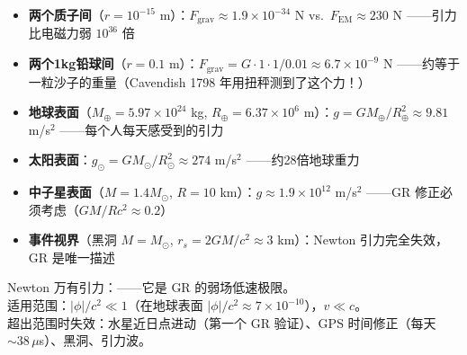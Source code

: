 

\begin{oombox}
  \begin{itemize}
    \item \textbf{两个质子间}（$r=10^{-15}$ m）：$F_{\text{grav}} \approx 1.9 \times 10^{-34}$ N vs.\ $F_{\text{EM}} \approx 230$ N ——引力比电磁力弱 $10^{36}$ 倍
    \item \textbf{两个1kg铅球间}（$r=0.1$ m）：$F_{\text{grav}} = G\cdot 1\cdot 1 / 0.01 \approx 6.7 \times 10^{-9}$ N ——约等于一粒沙子的重量（Cavendish 1798 年用扭秤测到了这个力！）
    \item \textbf{地球表面}（$M_\oplus=5.97\times10^{24}$ kg, $R_\oplus=6.37\times10^6$ m）：$g = GM_\oplus/R_\oplus^2 \approx 9.81$ m/s$^2$ ——每个人每天感受到的引力
    \item \textbf{太阳表面}：$g_\odot = GM_\odot/R_\odot^2 \approx 274$ m/s$^2$ ——约28倍地球重力
    \item \textbf{中子星表面}（$M=1.4M_\odot$, $R=10$ km）：$g \approx 1.9 \times 10^{12}$ m/s$^2$ ——GR 修正必须考虑（$GM/Rc^2 \approx 0.2$）
    \item \textbf{事件视界}（黑洞 $M=M_\odot$, $r_s=2GM/c^2 \approx 3$ km）：Newton 引力完全失效，GR 是唯一描述
  \end{itemize}
\end{oombox}

\precisionbox[精度等级]
  Newton 万有引力：\precisionapprox——它是 GR 的弱场低速极限。\\
  适用范围：$|\phi|/c^2 \ll 1$（在地球表面 $|\phi|/c^2 \approx 7\times 10^{-10}$），$v \ll c$。\\
  超出范围时失效：水星近日点进动（第一个 GR 验证）、GPS 时间修正（每天 $\sim 38\,\mu$s）、黑洞、引力波。
\endprecisionbox

